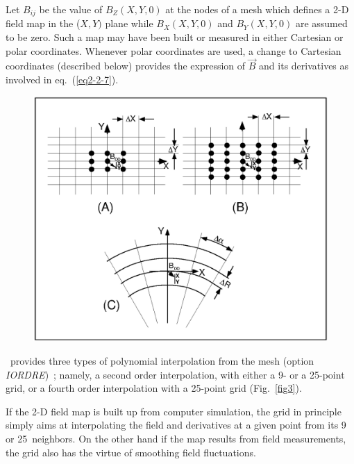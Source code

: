 Let $ B_{ij} $ be the value of $ B_Z(X,Y,0) $ at the nodes of a mesh
which defines a 2-D field map in the ($ X,Y) $ plane while $ B_X(X,Y,0) $ and $ B_Y(X,Y,0) $
are assumed to be zero.  Such a map may have been built or measured 
in either Cartesian or polar coordinates.  Whenever polar coordinates are used, a
change to Cartesian coordinates (described below) provides the expression of 
$ \vec  B $ and its derivatives as involved in eq.~(\ref{eq2-2-7}). 


\begin{figure}[h] %
\centerline{\includegraphics[width=15.5cm]{Fig3.ps}}
\end{figure}


\noindent \zgou\ provides three types of polynomial
interpolation from the mesh (option \textsl{IORDRE})~; namely, a second order interpolation, 
with either a 9- or a 25-point grid, or a fourth 
order interpolation with a 25-point  grid (Fig.~\ref{fig3}).  

\noindent If the 2-D field map is built up from  computer simulation, the grid in principle simply
aims at interpolating the field  and derivatives at a given point from its 9 or 25~neighbors.  
On the other hand if 
the map results from field measurements, the grid also has the virtue of  smoothing field 
fluctuations. 

